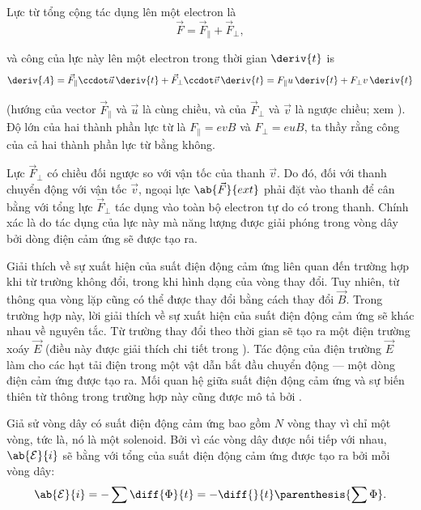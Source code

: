 Lực từ tổng cộng tác dụng lên một electron là
\begin{equation*}
    \vec{F} = \vec{F}_{\parallel} + \vec{F}_{\perp},
\end{equation*}

\noindent
và công của lực này lên một electron trong thời gian $\deriv{t}$ is
\begin{equation*}
    \deriv{A} = \vec{F}_{\parallel} \ccdot \vec{u}\, \deriv{t} + \vec{F}_{\perp} \ccdot \vec{v}\, \deriv{t} = F_{\parallel} u\, \deriv{t} + F_{\perp} v\, \deriv{t}
\end{equation*}

\noindent
(hướng của vector $\vec{F}_{\parallel}$ và $\vec{u}$ là cùng chiều, và của $\vec{F}_{\perp}$ và $\vec{v}$ là ngược chiều; xem ).
Độ lớn của hai thành phần lực từ là $F_{\parallel}=evB$ và $F_{\perp}=euB$, ta thầy rằng công của cả hai thành phần lực từ bằng không.

Lực $\vec{F}_{\perp}$ có chiều đối ngược so với vận tốc của thanh $\vec{v}$.
Do đó, đối với thanh chuyển động với vận tốc $\vec{v}$, ngoại lực $\ab{\vec{F}}{ext}$ phải đặt vào thanh để cân bằng với tổng lực $\vec{F}_{\perp}$ tác dụng vào toàn bộ electron tự do có trong thanh.
Chính xác là do tác dụng của lực này mà năng lượng được giải phóng trong vòng dây bởi dòng điện cảm ứng sẽ được tạo ra.

Giải thích về sự xuất hiện của suất điện động cảm ứng liên quan đến trường hợp khi từ trường không đổi, trong khi hình dạng của vòng thay đổi.
Tuy nhiên, từ thông qua vòng lặp cũng có thể được thay đổi bằng cách thay đổi $\vec{B}$. Trong trường hợp này, lời giải thích về sự xuất hiện của suất điện động cảm ứng sẽ khác nhau về nguyên tắc.
Từ trường thay đổi theo thời gian sẽ tạo ra một điện trường xoáy $\vec{E}$ (điều này được giải thích chi tiết trong ).
Tác động của điện trường $\vec{E}$ làm cho các hạt tải điện trong một vật dẫn bắt đầu chuyển động --- một dòng điện cảm ứng được tạo ra.
Mối quan hệ giữa suất điện động cảm ứng và sự biến thiên từ thông trong trường hợp này cũng được mô tả bởi .

Giả sử vòng dây có suất điện động cảm ứng bao gồm $N$ vòng thay vì chỉ một vòng, tức là, nó là một solenoid.
Bởi vì các vòng dây được nối tiếp với nhau, $\ab{\mathcal{E}}{i}$ sẽ bằng với tổng của suất điện động cảm ứng được tạo ra bởi mỗi vòng dây:
\begin{equation*}
    \ab{\mathcal{E}}{i} = - \sum \diff{\Phi}{t} = - \diff{}{t}\parenthesis{\sum \Phi}.
\end{equation*}

